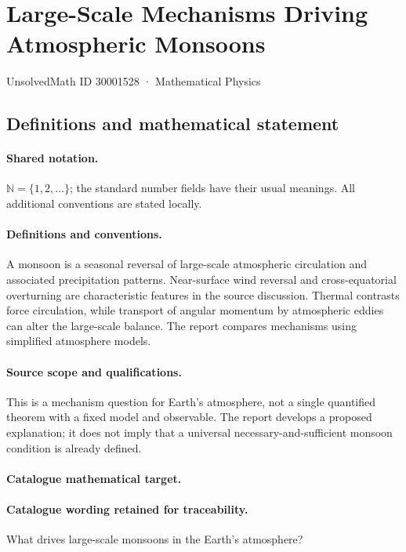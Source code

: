 \documentclass[11pt]{article}
\begin{document}
\setcounter{section}{30001527}
\section{Large-Scale Mechanisms Driving Atmospheric Monsoons}\label{30001528}
{\small UnsolvedMath ID 30001528 · Mathematical Physics}
\subsection{Definitions and mathematical statement}

\paragraph{Shared notation.}$\mathbb N=\{1,2,\ldots\}$; the standard number fields have their usual meanings. All additional conventions are stated locally.


\paragraph{Definitions and conventions.} A monsoon is a seasonal reversal of large-scale atmospheric circulation and associated precipitation patterns. Near-surface wind reversal and cross-equatorial overturning are characteristic features in the source discussion. Thermal contrasts force circulation, while transport of angular momentum by atmospheric eddies can alter the large-scale balance. The report compares mechanisms using simplified atmosphere models.

\paragraph{Source scope and qualifications.} This is a mechanism question for Earth's atmosphere, not a single quantified theorem with a fixed model and observable. The report develops a proposed explanation; it does not imply that a universal necessary-and-sufficient monsoon condition is already defined.

\paragraph{Catalogue mathematical target.}
\paragraph{Catalogue wording retained for traceability.}
What drives large-scale monsoons in the Earth's atmosphere?
\end{document}
